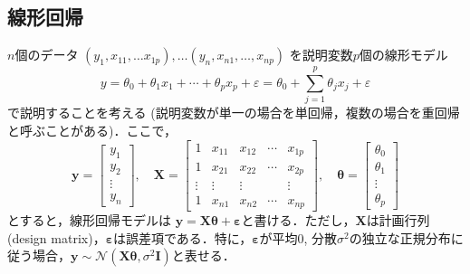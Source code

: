 \subsection{線形回帰}$n$個のデータ $\left(y_1,x_{11}, \ldots x_{1p}\right),\ldots \left(y_n,x_{n1},\ldots, x_{np}\right)$ を説明変数$p$個の線形モデル 
$$
y=\theta_0+\theta_1x_1+\cdots+\theta_px_p+\varepsilon=\theta_0+\sum_{j=1}^p \theta_jx_j+\varepsilon
$$
で説明することを考える (説明変数が単一の場合を単回帰，複数の場合を重回帰と呼ぶことがある)．ここで， 
$$
\mathbf{y}= \left[ \begin{array}{c} y_1\\ y_2\\ \vdots \\ y_n \end{array} \right],\quad 
\mathbf{X}=\left[ \begin{array}{ccccc} 1 & x_{11}& x_{12} &\cdots & x_{1p} \\ 1& x_{21}& x_{22}&\cdots & x_{2p}\\ \vdots & \vdots& \vdots& & \vdots \\1 &x_{n1} & x_{n2} &\cdots & x_{np} \end{array} \right],\quad
\mathbf{\theta}= \left[ \begin{array}{c} \theta_0\\ \theta_1\\ \vdots \\ \theta_p \end{array} \right]
$$
とすると，線形回帰モデルは $\mathbf{y}=\mathbf{X}\mathbf{\theta}+\mathbf{\varepsilon}$と書ける．ただし，$\mathbf{X}$は計画行列 (design matrix)，$\mathbf{\varepsilon}$は誤差項である．特に，$\mathbf{\varepsilon}$が平均0, 分散$\sigma^2$の独立な正規分布に従う場合，$\mathbf{y}\sim \mathcal{N}(\mathbf{X}\mathbf{\theta}, \sigma^2\mathbf{I})$と表せる．